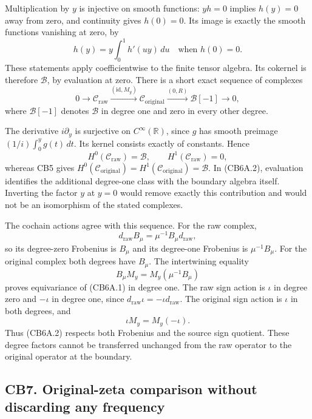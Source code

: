 Multiplication by \(y\) is injective on smooth functions: \(yh=0\)
implies \(h(y)=0\) away from zero, and continuity gives \(h(0)=0\). Its
image is exactly the smooth functions vanishing at zero, by \[
h(y)=y\int_0^1h'(uy)\,du\quad\text{when }h(0)=0.
\] These statements apply coefficientwise to the finite tensor algebra.
Its cokernel is therefore \(\mathcal B\), by evaluation at zero. There
is a short exact sequence of complexes \[
0\longrightarrow\mathcal C_{\mathrm{raw}}
\xrightarrow{(\mathrm{id},M_y)}
\mathcal C_{\mathrm{original}}
\xrightarrow{(0,R)}
\mathcal B[-1]\longrightarrow0,
\tag{CB6A.2}
\] where \(\mathcal B[-1]\) denotes \(\mathcal B\) in degree one and
zero in every other degree.

The derivative \(i\partial_y\) is surjective on \(C^\infty(\mathbb R)\),
since \(g\) has smooth preimage \((1/i)\int_0^y g(t)\,dt\). Its kernel
consists exactly of constants. Hence \[
H^0(\mathcal C_{\mathrm{raw}})=\mathcal B,\qquad
H^1(\mathcal C_{\mathrm{raw}})=0,
\] whereas CB5 gives
\(H^0(\mathcal C_{\mathrm{original}})=H^1(\mathcal C_{\mathrm{original}})=\mathcal B\).
In (CB6A.2), evaluation identifies the additional degree-one class with
the boundary algebra itself. Inverting the factor \(y\) at \(y=0\) would
remove exactly this contribution and would not be an isomorphism of the
stated complexes.

The cochain actions agree with this sequence. For the raw complex, \[
d_{\mathrm{raw}}B_\mu=\mu^{-1}B_\mu d_{\mathrm{raw}},
\] so its degree-zero Frobenius is \(B_\mu\) and its degree-one
Frobenius is \(\mu^{-1}B_\mu\). For the original complex both degrees
have \(B_\mu\). The intertwining equality \[
B_\mu M_y=M_y(\mu^{-1}B_\mu)
\tag{CB6A.3}
\] proves equivariance of (CB6A.1) in degree one. The raw sign action is
\(\iota\) in degree zero and \(-\iota\) in degree one, since
\(d_{\mathrm{raw}}\iota=-\iota d_{\mathrm{raw}}\). The original sign
action is \(\iota\) in both degrees, and \[
\iota M_y=M_y(-\iota).
\tag{CB6A.4}
\] Thus (CB6A.2) respects both Frobenius and the source sign quotient.
These degree factors cannot be transferred unchanged from the raw
operator to the original operator at the boundary.

\subsection{CB7. Original-zeta comparison without discarding any
frequency}\label{cb7.-original-zeta-comparison-without-discarding-any-frequency}

